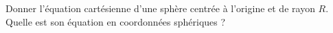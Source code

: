 
\begin{exercice}\label{exoOutilsMath-0010}

	Donner l'équation cartésienne d'une sphère centrée à l'origine et de rayon $R$. Quelle est son équation en coordonnées sphériques ?

\end{exercice}
